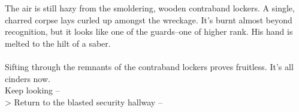 The air is still hazy from the smoldering, wooden contraband lockers. A single, charred corpse lays curled up amongst the wreckage. It's burnt almost beyond recognition, but it looks like one of the guards--one of higher rank. His hand is melted to the hilt of a saber.\\
\\

Sifting through the remnants of the contraband lockers proves fruitless. It's all cinders now.\\

 Keep looking -- \\
> Return to the blasted security hallway -- 